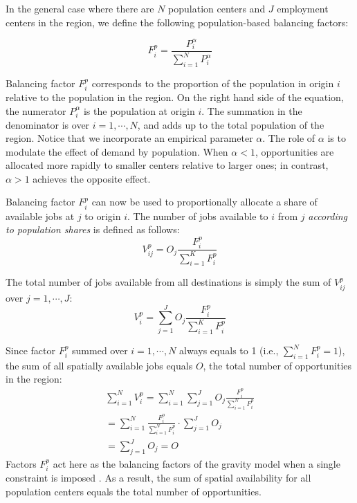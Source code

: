 \documentclass[]{elsarticle} %
\begin{document}
In the general case where there are \(N\) population centers and \(J\)
employment centers in the region, we define the following
population-based balancing factors:

\begin{equation}
\label{eq:pop-alloc-factor}
F^p_{i} = \frac{P_{i}^\alpha}{\sum_{i=1}^N P_{i}^\alpha}
\end{equation}

Balancing factor \(F^p_{i}\) corresponds to the proportion of the
population in origin \(i\) relative to the population in the region. On
the right hand side of the equation, the numerator \(P_{i}^\alpha\) is
the population at origin \(i\). The summation in the denominator is over
\(i=1,\cdots,N\), and adds up to the total population of the region.
Notice that we incorporate an empirical parameter \(\alpha\). The role
of \(\alpha\) is to modulate the effect of demand by population. When
\(\alpha <1\), opportunities are allocated more rapidly to smaller
centers relative to larger ones; in contrast, \(\alpha>1\) achieves the
opposite effect.

Balancing factor \(F^p_{i}\) can now be used to proportionally allocate
a share of available jobs at \(j\) to origin \(i\). The number of jobs
available to \(i\) from \(j\) \emph{according to population shares} is
defined as follows: \[
V^p_{ij} = O_j\frac{F^p_{i}}{\sum_{i=1}^K F^p_{i}}
\]

The total number of jobs available from all destinations is simply the
sum of \(V^p_{ij}\) over \(j=1,\cdots, J\): \[
V^p_{i} = \sum_{j=1}^J O_j\frac{F^p_{i}}{\sum_{i=1}^K F^p_{i}}
\]

Since factor \(F^p_{i}\) summed over \(i=1,\cdots,N\) always equals to 1
(i.e., \(\sum_{i=1}^{N} F^p_{i} = 1\)), the sum of all spatially
available jobs equals \(O\), the total number of opportunities in the
region: \[
\begin{array}{l}
\sum_{i=1}^N V^p_i =\sum_{i=1}^N\sum_{j=1}^JO_j\frac{F^p_{i}}{\sum_{i=1}^N F^p_{i}}\\
=\sum_{i=1}^N \frac{F^p_{i}}{\sum_{i=1}^N F^p_{i}}\cdot\sum_{j=1}^JO_j\\
=\sum_{j=1}^J O_j = O
\end{array}
\] Factors \(F^p_{i}\) act here as the balancing factors of the gravity
model when a single constraint is imposed \citep[i.e., to ensure the
sums of columns are equal to the number of opportunities per
destination, see][pp.~179-180 and 183-184]{ortuzar_2011_modelling}. As a
result, the sum of spatial availability for all population centers
equals the total number of opportunities.
\end{document}
